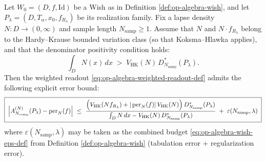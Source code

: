 \begin{theorem}\label{thm:op-algebra-lapse-weighted-wish-koksma}
Let \(W_0=(D,f,\mathrm{Id})\) be a Wish as in Definition \ref{def:op-algebra-wish}, and let \(P_\lambda=(D,T_\alpha,x_0,f_{R_\lambda})\) be its realization family.
Fix a lapse density \(N:D\to(0,\infty)\) and sample length \(N_{\mathrm{samp}}\ge 1\).
Assume that \(N\) and \(N\cdot f_{R_\lambda}\) belong to the Hardy--Krause bounded variation class (so that Koksma--Hlawka applies), and that the denominator positivity condition holds:
\begin{equation}\label{eq:op-algebra-denominator-positivity}
\int_D N(x)\,dx\;>\;V_{\mathrm{HK}}(N)\,D_{N_{\mathrm{samp}}}^{\ast}(P_\lambda).
\end{equation}
Then the weighted readout \eqref{eq:op-algebra-weighted-readout-def} admits the following explicit error bound:
\begin{equation}\label{eq:op-algebra-weighted-koksma-bound}
\boxed{\;
\left|
A^{(N)}_{N_{\mathrm{samp}}}(P_\lambda)-\operatorname{per}_{N}(f)
\right|
\ \le\
\frac{\Bigl(V_{\mathrm{HK}}(N f_{R_\lambda})+|\operatorname{per}_{N}(f)|\,V_{\mathrm{HK}}(N)\Bigr)\,D_{N_{\mathrm{samp}}}^{\ast}(P_\lambda)}
{\int_D N\,dx- V_{\mathrm{HK}}(N)\,D_{N_{\mathrm{samp}}}^{\ast}(P_\lambda)}
\;+\;\varepsilon(N_{\mathrm{samp}},\lambda)\;}
\end{equation}
where \(\varepsilon(N_{\mathrm{samp}},\lambda)\) may be taken as the combined budget \eqref{eq:op-algebra-wish-eps-def} from Definition \ref{def:op-algebra-wish} (tabulation error + regularization error).
\end{theorem}

